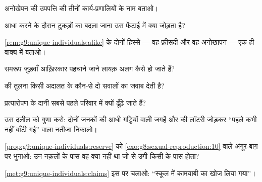 \begin{exercise}[$\star$]\label{exo:g9:unique-individuals:1}
अनोखेपन की उपपत्ति की तीनों कार्य-प्रणालियों के नाम बताओ।
\end{exercise}

\begin{exercise}[$\star$]\label{exo:g9:unique-individuals:2}
आधा करने के दौरान टुकड़ों का बदला जाना उस फेंटाई में क्या जोड़ता है?
\end{exercise}

\begin{exercise}[$\star$]\label{exo:g9:unique-individuals:3}
\cref{rem:g9:unique-individuals:alike} के दोनों हिस्से --- वह फ़ीसदी और
वह अनोखापन --- एक ही वाक्य में बताओ।
\end{exercise}

\begin{exercise}[$\star$]\label{exo:g9:unique-individuals:4}
समरूप जुड़वाँ आख़िरकार पहचाने जाने लायक़ अलग कैसे हो जाते हैं?
\end{exercise}

\begin{exercise}[$\star$]\label{exo:g9:unique-individuals:5}
 की तुलना किसी अदालत के कौन-से दो सवालों का जवाब देती है?
\end{exercise}

\begin{exercise}[$\star$]\label{exo:g9:unique-individuals:6}
प्रत्यारोपण के दानी सबसे पहले परिवार में क्यों ढूँढ़े जाते हैं?
\end{exercise}

\begin{exercise}[$\star\star$]\label{exo:g9:unique-individuals:7}
उस दलील को गुणा करो: दोनों जनकों की आधी गड्डियों वाली जगहें और  की
लॉटरी जोड़कर ``पहले कभी नहीं बाँटी गई'' वाला नतीजा निकालो।
\end{exercise}

\begin{exercise}[$\star\star$]\label{exo:g9:unique-individuals:8}
\cref{prop:g9:unique-individuals:reserve} को
\cref{exo:g8:sexual-reproduction:10} वाले अंगूर-बाग़ पर भुनाओ: उन
नक़लों के पास वह क्या नहीं था जो  से उगी किसी  के पास होता?
\end{exercise}

\begin{exercise}[$\star\star$]\label{exo:g9:unique-individuals:9}
\cref{met:g9:unique-individuals:claims} इस पर चलाओ: ``स्कूल में
कामयाबी का  खोज लिया गया''।
\end{exercise}

